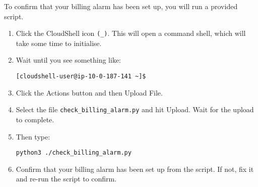 To confirm that your billing alarm has been set up, you will run a provided script.
\begin{enumerate}
\item Click the CloudShell icon \texttt{(\textrangle\_)}.
  This will open a command shell, which will take some time to initialise.

\item Wait until you see something like:
\begin{verbatim}
[cloudshell-user@ip-10-0-187-141 ~]$ 
\end{verbatim}

\item Click the Actions button and then Upload File.

\item Select the file \texttt{check\_billing\_alarm.py} and hit Upload.
  Wait for the upload to complete.

\item Then type:
\begin{verbatim}
python3 ./check_billing_alarm.py
\end{verbatim}

\item Confirm that your billing alarm has been set up from the script.
  If not, fix it and re-run the script to confirm. 

\end{enumerate}
  





